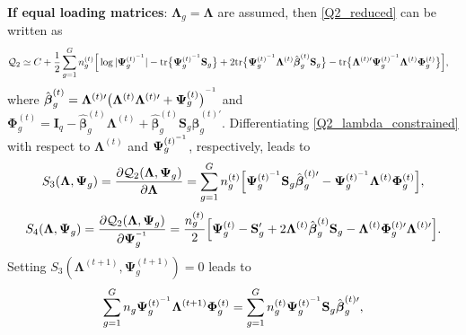 \documentclass[12pt]{article}
\newcommand{\vecI}{\mathbf{I}}
\newcommand{\inv}{^{\raisebox{.2ex}{$\scriptscriptstyle-1$}}}
\begin{document}
\noindent \textbf{If equal loading matrices}: $\mathbf{\Lambda}_g = \mathbf{\Lambda}$ are assumed, then \eqref{Q2_reduced} can be written as
\begin{equation}
\label{Q2_lambda_constrained}
\begin{split}
\mathcal{Q}_2 & \simeq C + \frac{1}{2} \sum_{g=1}^G n_g^{(t)} \Big[ \log |\mathbf{\Psi}_g^{(t) \inv}| - \text{tr} \big\{\mathbf{\Psi}_g^{(t) \inv} \mathbf{S}_g \big\} + 2 \text{tr} \big\{\mathbf{\Psi}_g^{(t) \inv} \mathbf{\Lambda}^{(t)} \hat{\boldsymbol{\beta}}_g^{(t)} \mathbf{S}_g \big\} - \text{tr}\big\{\mathbf{\Lambda}^{(t) \prime} \mathbf{\Psi}_g^{(t) \inv} \mathbf{\Lambda}^{(t)} \mathbf{\Phi}_g^{(t)} \big\} \Big],
\end{split}
\end{equation} 
where $\hat{\boldsymbol{\beta}}_g^{(t)} = \mathbf{\Lambda}^{(t)\prime} \big(\mathbf{\Lambda}^{(t)} \mathbf{\Lambda}^{(t) \prime} + \mathbf{\Psi}_g^{(t)} \big)^{\inv}$ and $\mathbf{\Phi}_g^{(t)} = \vecI_q - \hat{\boldsymbol{\beta}}_g^{(t)} \mathbf{\Lambda}^{(t)} +  \hat{\boldsymbol{\beta}}_g^{(t)} \mathbf{S}_g \hat{\boldsymbol{\beta}}_g^{(t) \prime}$. Differentiating \eqref{Q2_lambda_constrained} with respect to $\mathbf{\Lambda}^{(t)}$ and $\mathbf{\Psi}_g^{(t) \inv}$, respectively, leads to
\begin{equation*}
S_3(\mathbf{\Lambda}, \mathbf{\Psi}_g) = \frac{\partial \mathcal{Q}_2(\mathbf{\Lambda}, \mathbf{\Psi}_g)}{\partial \mathbf{\Lambda}} = \sum_{g=1}^G n_g^{(t)}  \Big[\mathbf{\Psi}_g^{(t) \inv} \mathbf{S}_g \hat{\boldsymbol{\beta}}_g^{(t) \prime} - \mathbf{\Psi}_g^{(t) \inv} \mathbf{\Lambda}^{(t)} \mathbf{\Phi}_g^{(t)}\Big],
\end{equation*}
\begin{equation*}
S_4(\mathbf{\Lambda}, \mathbf{\Psi}_g) = \frac{\partial \mathcal{Q}_2(\mathbf{\Lambda}, \mathbf{\Psi}_g)}{\partial \mathbf{\Psi}_g^{\inv}} = \frac{n_g^{(t)}}{2} \Big[ \mathbf{\Psi}_g^{(t)} - \mathbf{S}_g^{\prime} + 2 \mathbf{\Lambda}^{(t)} \hat{\boldsymbol{\beta}}_g^{(t)}  \mathbf{S}_g - \mathbf{\Lambda}^{(t)} \mathbf{\Phi}_g^{(t) \prime} \mathbf{\Lambda}^{(t) \prime} \Big]. 
\end{equation*}
Setting $S_3(\mathbf{\Lambda}^{(t+1)}, \mathbf{\Psi}_g^{(t+1)}) = 0$ leads to 
\begin{equation}
\label{solvingS3}
\sum_{g=1}^G n_g \mathbf{\Psi}_g^{(t) \inv} \mathbf{\Lambda}^{(t+1)} \mathbf{\Phi}_g^{(t)} = \sum_{g=1}^G n_g^{(t)} \mathbf{\Psi}_g^{(t) \inv} \mathbf{S}_g \hat{\boldsymbol{\beta}}_g^{(t) \prime},
\end{equation}
\end{document}
